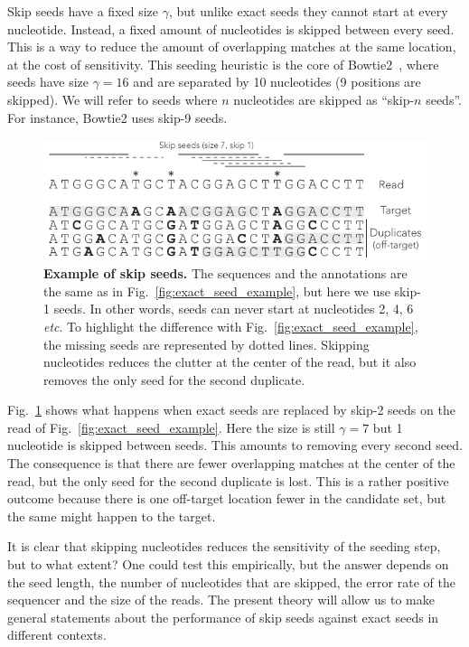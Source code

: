\documentclass{article}
\begin{document}
Skip seeds have a fixed size $\gamma$, but unlike exact seeds they cannot
start at every nucleotide. Instead, a fixed amount of nucleotides is
skipped between every seed. This is a way to reduce the amount of
overlapping matches at the same location, at the cost of sensitivity. This
seeding heuristic is the core of Bowtie2~\cite{pmid22388286}, where seeds
have size $\gamma=16$ and are separated by 10 nucleotides (9 positions are
skipped). We will refer to seeds where $n$ nucleotides are skipped as
``skip-$n$ seeds''. For instance, Bowtie2 uses skip-9 seeds.

\begin{figure}[h]
\centering
\includegraphics[scale=1]{skip_seed_example.pdf}
\caption{\textbf{Example of skip seeds.}
The sequences and the annotations are the same as in
Fig.~\ref{fig:exact_seed_example}, but here we use skip-1 seeds. In other
words, seeds can never start at nucleotides 2, 4, 6 \textit{etc}. To
highlight the difference with Fig.~\ref{fig:exact_seed_example}, the
missing seeds are represented by dotted lines. Skipping nucleotides
reduces the clutter at the center of the read, but it also removes the
only seed for the second duplicate.}
\label{fig:skip_seed_example}
\end{figure}

Fig.~\ref{fig:skip_seed_example} shows what happens when exact seeds are
replaced by skip-2 seeds on the read of Fig.~\ref{fig:exact_seed_example}.
Here the size is still $\gamma=7$ but 1 nucleotide is skipped between
seeds. This amounts to removing every second seed. The consequence is that
there are fewer overlapping matches at the center of the read, but the
only seed for the second duplicate is lost. This is a rather positive
outcome because there is one off-target location fewer in the candidate
set, but the same might happen to the target.

It is clear that skipping nucleotides reduces the sensitivity of the
seeding step, but to what extent? One could test this empirically, but the
answer depends on the seed length, the number of nucleotides that are
skipped, the error rate of the sequencer and the size of the reads. The
present theory will allow us to make general statements about the
performance of skip seeds against exact seeds in different contexts.
\end{document}
